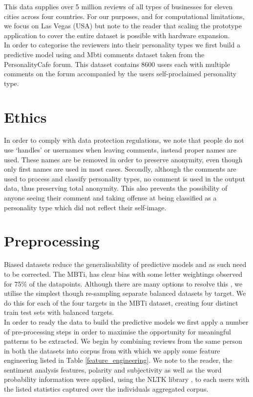 \documentclass[sigconf, nonacm]{acmart}
\begin{document}
This data supplies over 5 million reviews of all types of businesses for eleven cities across four countries. For our purposes, and for computational limitations, we focus on Las Vegas (USA) but note to the reader that scaling the prototype application to cover the entire dataset is possible with hardware expansion. \\

In order to categorise the reviewers into their personality types we first build a predictive model using and Mbti comments dataset \cite{mbti_data} taken from the PersonalityCafe forum. This dataset contains 8600 users each with multiple comments on the forum accompanied by the users self-proclaimed personality type.   

\section{Ethics}

In order to comply with data protection regulations, we note that people do not use ‘handles’ or usernames when leaving comments, instead proper names are used. These names are be removed in order to preserve anonymity, even though only first names are used in most cases. Secondly, although the comments are used to process and classify personality types, no comment is used in the output data, thus preserving total anonymity. This also prevents the possibility of anyone seeing their comment and taking offense at being classified as a personality type which did not reflect their self-image.


\section{Preprocessing}

Biased datasets reduce the generalisability of predictive models and as such need to be corrected. The MBTi, has clear bias with some letter weightings observed for 75\% of the datapoints. Although there are many options to resolve this \cite{huang2007correcting}, we utilise the simplest though re-sampling separate balanced datasets by target. We do this for each of the four targets in the MBTi dataset, creating four distinct train test sets with balanced targets.   \\

In order to ready the data to build the predictive models we first apply a number of pre-processing steps in order to maximise the opportunity for meaningful patterns to be extracted. We begin by combining reviews from the same person in both the datasets into corpus from with which we apply some feature engineering listed in Table \ref{feature_engineering}. We note to the reader, the sentiment analysis features, polarity and subjectivity as well as the word probability information were applied, using the NLTK library \cite{bird2004nltk}, to each users with the listed statistics captured over the individuals aggregated corpus. \\
\end{document}
